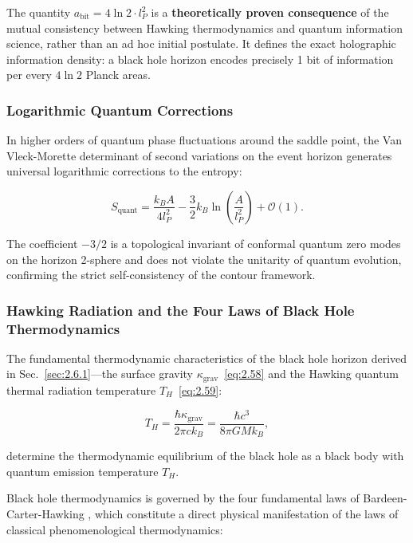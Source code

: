 The quantity $a_{\text{bit}} = 4\ln 2 \cdot l_P^2$ is a \textbf{theoretically proven consequence} of the mutual consistency between Hawking thermodynamics and quantum information science, rather than an ad hoc initial postulate. It defines the exact holographic information density: a black hole horizon encodes precisely 1 bit of information per every $4\ln 2$ Planck areas.

\subsubsection{Logarithmic Quantum Corrections}\label{sec:2.6.3}

In higher orders of quantum phase fluctuations around the saddle point, the Van Vleck-Morette determinant of second variations on the event horizon generates universal logarithmic corrections to the entropy:

\begin{equation}\label{eq:2.68}\label{eq:2.119}\tag{2.68}
S_{\text{quant}} = \frac{k_B A}{4 l_P^2} - \frac{3}{2} k_B \ln\left( \frac{A}{l_P^2} \right) + \mathcal{O}(1).
\end{equation}

The coefficient $-3/2$ is a topological invariant of conformal quantum zero modes on the horizon 2-sphere and does not violate the unitarity of quantum evolution, confirming the strict self-consistency of the contour framework.

\subsubsection{Hawking Radiation and the Four Laws of Black Hole Thermodynamics}\label{sec:2.6.4}

The fundamental thermodynamic characteristics of the black hole horizon derived in Sec.~\ref{sec:2.6.1}---the surface gravity $\kappa_{\text{grav}}$~\eqref{eq:2.58} and the Hawking quantum thermal radiation temperature $T_H$~\eqref{eq:2.59}:

\begin{equation*}\label{eq:2.120}
T_H = \frac{\hbar \kappa_{\text{grav}}}{2\pi c k_B} = \frac{\hbar c^3}{8\pi G M k_B},
\end{equation*}

determine the thermodynamic equilibrium of the black hole as a black body with quantum emission temperature $T_H$.

Black hole thermodynamics is governed by the four fundamental laws of Bardeen-Carter-Hawking \cite{ref20}, which constitute a direct physical manifestation of the laws of classical phenomenological thermodynamics:

